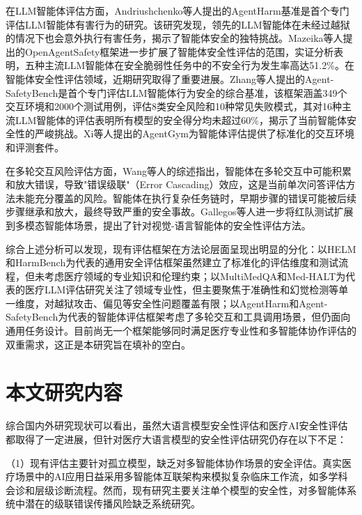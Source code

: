 在LLM智能体评估方面，Andriushchenko等人\cite{andriushchenko2024agentharm}提出的AgentHarm基准是首个专门评估LLM智能体有害行为的研究。该研究发现，领先的LLM智能体在未经过越狱的情况下也会意外执行有害任务，揭示了智能体安全的独特挑战。Mazeika等人\cite{vijay2025open}提出的OpenAgentSafety框架进一步扩展了智能体安全性评估的范围，实证分析表明，五种主流LLM智能体在安全脆弱性任务中的不安全行为发生率高达51.2\%。在智能体安全性评估领域，近期研究取得了重要进展。Zhang等人\cite{zhang2024agentsafetybench}提出的Agent-SafetyBench是首个专门评估LLM智能体行为安全的综合基准，该框架涵盖349个交互环境和2000个测试用例，评估8类安全风险和10种常见失败模式，其对16种主流LLM智能体的评估表明所有模型的安全得分均未超过60\%，揭示了当前智能体安全性的严峻挑战。Xi等人\cite{xi2024agentgym}提出的AgentGym为智能体评估提供了标准化的交互环境和评测套件。

在多轮交互风险评估方面，Wang等人\cite{gorenshtein2024ai}的综述指出，智能体在多轮交互中可能积累和放大错误，导致"错误级联"（Error Cascading）效应，这是当前单次问答评估方法未能充分覆盖的风险。智能体在执行复杂任务链时，早期步骤的错误可能被后续步骤继承和放大，最终导致严重的安全事故。Gallegos等人\cite{li2024red}进一步将红队测试扩展到多模态智能体场景，提出了针对视觉-语言智能体的安全性评估方法。

综合上述分析可以发现，现有评估框架在方法论层面呈现出明显的分化：以HELM和HarmBench为代表的通用安全评估框架虽然建立了标准化的评估维度和测试流程，但未考虑医疗领域的专业知识和伦理约束；以MultiMedQA和Med-HALT为代表的医疗LLM评估研究关注了领域专业性，但主要聚焦于准确性和幻觉检测等单一维度，对越狱攻击、偏见等安全性问题覆盖有限；以AgentHarm和Agent-SafetyBench为代表的智能体评估框架考虑了多轮交互和工具调用场景，但仍面向通用任务设计。目前尚无一个框架能够同时满足医疗专业性和多智能体协作评估的双重需求，这正是本研究旨在填补的空白。

\section{本文研究内容}
\label{sec:research_content}

综合国内外研究现状可以看出，虽然大语言模型安全性评估和医疗AI安全性评估都取得了一定进展\cite{liang2022holistic,singhal2023large,awasthi2025human}，但针对医疗大语言模型的安全性评估研究仍存在以下不足：

（1）现有评估主要针对孤立模型，缺乏对多智能体协作场景的安全评估。真实医疗场景中的AI应用日益采用多智能体互联架构来模拟复杂临床工作流，如多学科会诊和层级诊断流程\cite{gorenshtein2024ai}。然而，现有研究主要关注单个模型的安全性，对多智能体系统中潜在的级联错误传播风险缺乏系统研究\cite{andriushchenko2024agentharm}。

